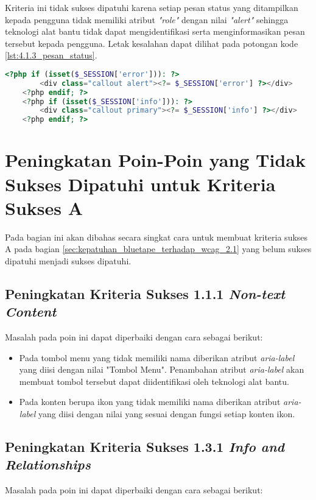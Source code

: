 Kriteria ini tidak sukses dipatuhi karena setiap pesan status yang ditampilkan kepada pengguna tidak memiliki atribut \textit{"role"} dengan nilai \textit{"alert"} sehingga teknologi alat bantu tidak dapat mengidentifikasi serta menginformasikan pesan tersebut kepada pengguna. Letak kesalahan dapat dilihat pada potongan kode \ref{lst:4.1.3_pesan_status}.

\begin{lstlisting}[frame=single, label={lst:4.1.3_pesan_status}, language=PHP, caption=Kriteria Sukses 4.1.3 - Atribut pada Pesan Status]
    <?php if (isset($_SESSION['error'])): ?>
        <div class="callout alert"><?= $_SESSION['error'] ?></div>
    <?php endif; ?>
    <?php if (isset($_SESSION['info'])): ?>
        <div class="callout primary"><?= $_SESSION['info'] ?></div>
    <?php endif; ?>
\end{lstlisting}

\section{Peningkatan Poin-Poin yang Tidak Sukses Dipatuhi untuk Kriteria Sukses A}
\label{sec:peningkatan_kriteria_sukses_a}
Pada bagian ini akan dibahas secara singkat cara untuk membuat kriteria sukses A pada bagian \ref{sec:kepatuhan_bluetape_terhadap_wcag_2.1} yang belum sukses dipatuhi menjadi sukses dipatuhi.

\subsection{Peningkatan Kriteria Sukses 1.1.1 \textit{Non-text Content}}
\label{subsec:peningkatan_kriteria_sukses_1.1.1}
Masalah pada poin ini dapat diperbaiki dengan cara sebagai berikut: 

\begin{itemize}
    \item Pada tombol menu yang tidak memiliki nama diberikan atribut \textit{aria-label} yang diisi dengan nilai "Tombol Menu". Penambahan atribut \textit{aria-label} akan membuat tombol tersebut dapat diidentifikasi oleh teknologi alat bantu.
    \item Pada konten berupa ikon yang tidak memiliki nama diberikan atribut \textit{aria-label} yang diisi dengan nilai yang sesuai dengan fungsi setiap konten ikon.
\end{itemize}

\subsection{Peningkatan Kriteria Sukses 1.3.1 \textit{Info and Relationships}}
\label{subsec:peningkatan_kriteria_sukses_1.3.1}
Masalah pada poin ini dapat diperbaiki dengan cara sebagai berikut:

